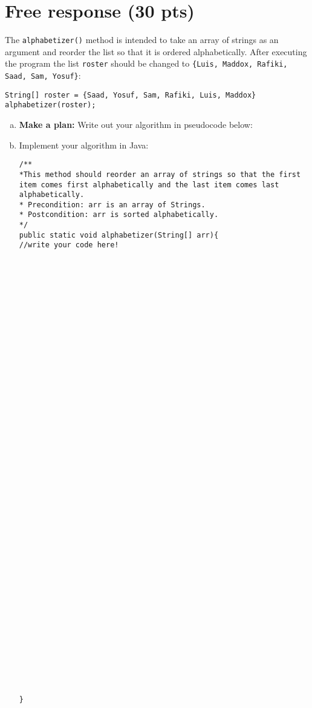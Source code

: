\documentclass{exam}
\begin{document}
\newpage

\section*{Free response (30 pts)} 
The \texttt{alphabetizer()} method is intended to take an array of strings as an argument and reorder the list so that it is ordered alphabetically. After executing the program the list \texttt{roster} should be changed to \texttt{\{Luis, Maddox, Rafiki, Saad, Sam, Yosuf\}}:

\begin{lstlisting}
String[] roster = {Saad, Yosuf, Sam, Rafiki, Luis, Maddox}
alphabetizer(roster);

\end{lstlisting}

\begin{enumerate}[a.]
\item \textbf{Make a plan:} Write out your algorithm in pseudocode below:

\makeemptybox{5in}

\newpage
\item
Implement your algorithm in Java:

\begin{lstlisting}
/**
*This method should reorder an array of strings so that the first item comes first alphabetically and the last item comes last alphabetically.
* Precondition: arr is an array of Strings.
* Postcondition: arr is sorted alphabetically.
*/
public static void alphabetizer(String[] arr){
//write your code here!












































}
\end{lstlisting}

\end{enumerate}
\end{document}

